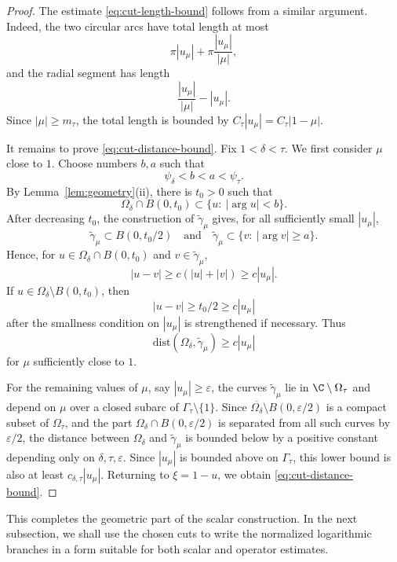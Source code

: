 \documentclass[11pt]{amsart}
\numberwithin{equation}{section}
\theoremstyle{definition}
\theoremstyle{plain}
\def\dist{\mathrm{dist}}
\begin{document}
\begin{proof}
The estimate \eqref{eq:cut-length-bound} follows from a similar argument. 
Indeed, the two circular arcs have total length at most
\[
        \pi |u_\mu|+\pi\frac{|u_\mu|}{|\mu|},
\]
and the radial segment has length
\[
        \frac{|u_\mu|}{|\mu|}-|u_\mu|.
\]
Since \(|\mu|\ge m_\tau\), the total length is bounded by
\(C_\tau |u_\mu|=C_\tau|1-\mu|\).

It remains to prove \eqref{eq:cut-distance-bound}.  Fix \(1<\delta<\tau\).
We first consider \(\mu\) close to \(1\).  Choose numbers \(b,a\) such that
\[
        \psi_\delta<b<a<\psi_\tau .
\]
By Lemma~\ref{lem:geometry}\textup{(ii)}, there is \(t_0>0\) such that
\[
        \Omega_\delta\cap B(0,t_0)\subset\{u:\ |\arg u|<b\}.
\]
After decreasing \(t_0\), the construction of \(\widetilde\gamma_\mu\) gives,
for all sufficiently small \(|u_\mu|\),
\[
        \widetilde\gamma_\mu\subset B(0,t_0/2)
        \quad\text{and}\quad
        \widetilde\gamma_\mu%
        \subset \{v:\ |\arg v|\ge a\}.
\]
Hence, for \(u\in\Omega_\delta\cap B(0,t_0)\) and
\(v\in\widetilde\gamma_\mu\),
\[
        |u-v|\ge c(|u|+|v|)\ge c|u_\mu|.
\]
If \(u\in\Omega_\delta\setminus B(0,t_0)\), then
\[
        |u-v|\ge t_0/2\ge c|u_\mu|
\]
after the smallness condition on \(|u_\mu|\) is strengthened if necessary.
Thus
\[
        \dist(\Omega_\delta,\widetilde\gamma_\mu)\ge c|u_\mu|
\]
for \(\mu\) sufficiently close to \(1\).

For the remaining values of \(\mu\), say \(|u_\mu|\ge\varepsilon\), the curves
\(\widetilde\gamma_\mu\) lie in \(\C\setminus\Omega_\tau\) and depend on
\(\mu\) over a closed subarc of \(\Gamma_\tau\setminus\{1\}\).  Since
\(\overline{\Omega_\delta}\setminus B(0,\varepsilon/2)\) is a compact subset
of \(\Omega_\tau\), and the part \(\Omega_\delta\cap B(0,\varepsilon/2)\) is
separated from all such curves by $\varepsilon/2$,  
the distance between
\(\Omega_\delta\) and \(\widetilde\gamma_\mu\) is bounded below by a positive
constant depending only on \(\delta,\tau,\varepsilon\).  Since \(|u_\mu|\) is
bounded above on \(\Gamma_\tau\), this lower bound is also at least
\(c_{\delta,\tau}|u_\mu|\).  Returning to \(\xi=1-u\), we obtain
\eqref{eq:cut-distance-bound}.
\end{proof}

This completes the geometric part of the scalar construction.  In the next  subsection, we shall use the
chosen cuts to write the normalized logarithmic branches in a form suitable for
both scalar and operator estimates.
\end{document}
